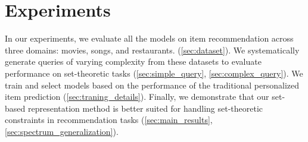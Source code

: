 \section{Experiments}
\vspace{-5pt}
\label{sec:experiments}
In our experiments, we evaluate all the models on item recommendation across three domains: movies, songs, and restaurants. (\ref{sec:dataset}). We systematically generate queries of varying complexity from these datasets to evaluate performance on set-theoretic tasks 
 (\ref{sec:simple_query}, \ref{sec:complex_query}). We train and select models based on the performance of the traditional personalized item prediction (\ref{sec:traning_details}). Finally, we demonstrate that our set-based representation method is better suited for handling set-theoretic constraints in recommendation tasks (\ref{sec:main_results}, \ref{sec:spectrum_generalization}).
